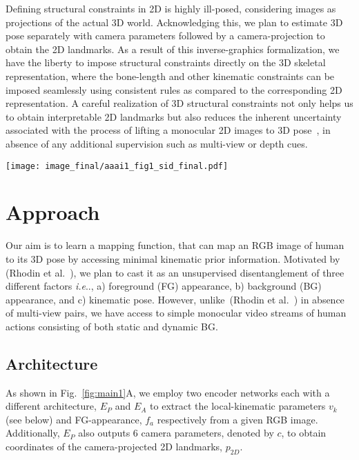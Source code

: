 \documentclass[letterpaper]{article} \usepackage{aaai20}  \usepackage{times}  \usepackage{helvet}  \usepackage{courier}  \usepackage{url}  \usepackage{graphicx}  \usepackage{amsmath}
\makeatletter
\DeclareRobustCommand\onedot{\futurelet\@let@token\@onedot}
\def\@onedot{\ifx\@let@token.\else.\null\fi\xspace}
\def\ie{\emph{i.e}\onedot} \def\Ie{\emph{I.e}\onedot}
\makeatother
\begin{document}
Defining structural constraints in 2D is highly ill-posed, considering images as projections of the actual 3D world. Acknowledging this, we plan to estimate 3D pose separately with camera parameters followed by a camera-projection to obtain the 2D landmarks. As a result of this inverse-graphics formalization, we have the liberty to impose structural constraints directly on the 3D skeletal representation, where the bone-length and other kinematic constraints can be imposed seamlessly using consistent rules as compared to the corresponding 2D representation. A careful realization of 3D structural constraints not only helps us to obtain interpretable 2D landmarks but also reduces the inherent uncertainty associated with the process of lifting a monocular 2D images to 3D pose~\cite{chen2019unsupervised}, in absence of any additional supervision such as multi-view or depth cues.




\begin{figure*}\begin{center}
	\texttt{[image: image\_final/aaai1\_fig1\_sid\_final.pdf]}
	\caption{\textbf{A.} Illustration of the proposed framework indicating output notation of individual modules. \textbf{B.} An overview of the three differentiable transformations, with step-wise progression of forward kinematics using local-kinematic parameters, $v_k$.
	}
 	\label{fig:main1}    
    \vspace{-4mm}
\end{center}
\end{figure*}




\section{Approach}
\label{sec:approach}
Our aim is to learn a mapping function, that can map an RGB image of human to its 3D pose by accessing minimal kinematic prior information. Motivated by ({\color{coolblack}Rhodin et al.~\citeyear{rhodin2018unsupervised}}), we plan to cast it as an unsupervised disentanglement of three different factors \ie, a) foreground (FG) appearance, b) background (BG) appearance, and c) kinematic pose. However, unlike~({\color{coolblack}Rhodin et al.~\citeyear{rhodin2018unsupervised}}) in absence of multi-view pairs, we have access to simple monocular video streams of human actions consisting of both static and dynamic BG. 


\subsection{Architecture}
As shown in Fig.~\ref{fig:main1}A, we employ two encoder networks each with a different architecture, $E_P$ and $E_A$ to extract the local-kinematic parameters $v_k$ (see below) and FG-appearance, $f_a$ respectively from a given RGB image. Additionally, $E_P$ also outputs 6 camera parameters, denoted by $c$, to obtain coordinates of the camera-projected 2D landmarks, $p_{2D}$.
\end{document}
